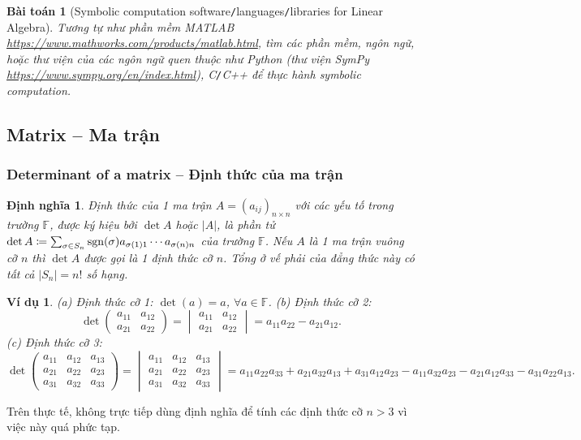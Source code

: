 \documentclass{article}
\newtheorem{baitoan}{Bài toán}
\newtheorem{dinhnghia}{Định nghĩa}
\newtheorem{vidu}{Ví dụ}
\begin{document}
\begin{baitoan}[Symbolic computation software{\tt/}languages{\tt/}libraries for Linear Algebra]
	Tương tự như phần mềm {\sf MATLAB} \url{https://www.mathworks.com/products/matlab.html}, tìm các phần mềm, ngôn ngữ, hoặc thư viện của các ngôn ngữ quen thuộc như {\sf Python} (thư viện {\sf SymPy} \url{https://www.sympy.org/en/index.html}), {\sf C{\tt/}C++} để thực hành symbolic computation.
\end{baitoan}


\subsection{Matrix -- Ma trận}

\subsubsection{Determinant of a matrix -- Định thức của ma trận}
\begin{dinhnghia}
	{\rm Định thức} của 1 ma trận $A = (a_{ij})_{n\times n}$ với các yếu tố trong trường $\mathbb{F}$, được ký hiệu bởi $\det A$ hoặc $|A|$, là phần tử $\det A\coloneqq\sum_{\sigma\in S_n} {\rm sgn}(\sigma)a_{\sigma(1)1}\cdots a_{\sigma(n)n}$ của trường $\mathbb{F}$. Nếu $A$ là 1 ma trận vuông cỡ $n$ thì $\det A$ được gọi là 1 {\rm định thức cỡ $n$}. Tổng ở vế phải của đẳng thức này có tất cả $|S_n| = n!$ số hạng.
\end{dinhnghia}

\begin{vidu}
	(a) Định thức cỡ 1: $\det(a) = a$, $\forall a\in\mathbb{F}$. (b) Định thức cỡ 2:
	\begin{equation*}
		\det\begin{pmatrix}
			a_{11} & a_{12}\\a_{21} & a_{22}
		\end{pmatrix} = \begin{vmatrix}
			a_{11} & a_{12}\\a_{21} & a_{22}
		\end{vmatrix} = a_{11}a_{22} - a_{21}a_{12}.
	\end{equation*}
	(c) Định thức cỡ 3:
	\begin{equation*}
		\det\begin{pmatrix}
			a_{11} & a_{12} & a_{13}\\a_{21} & a_{22} & a_{23}\\a_{31} & a_{32} & a_{33}
		\end{pmatrix} = \begin{vmatrix}
			a_{11} & a_{12} & a_{13}\\a_{21} & a_{22} & a_{23}\\a_{31} & a_{32} & a_{33}
		\end{vmatrix} = a_{11}a_{22}a_{33} + a_{21}a_{32}a_{13} + a_{31}a_{12}a_{23} - a_{11}a_{32}a_{23} - a_{21}a_{12}a_{33} - a_{31}a_{22}a_{13}.
	\end{equation*}
\end{vidu}
Trên thực tế, không trực tiếp dùng định nghĩa để tính các định thức cỡ $n > 3$ vì việc này quá phức tạp.
\end{document}
